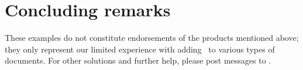 \section{Concluding remarks}

These examples do not constitute endorsements of the products mentioned above; they only represent our limited experience with adding \PS\ to various types of documents.  For other solutions and further help, please post messages to
.
